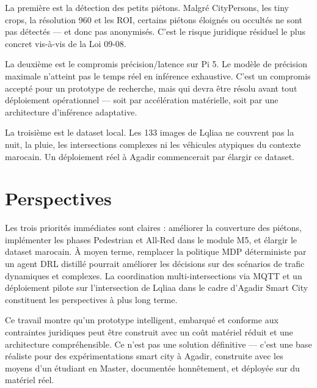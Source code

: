 La première est la détection des petits
piétons. Malgré CityPersons, les tiny
crops, la résolution 960 et les ROI,
certains piétons éloignés ou occultés
ne sont pas détectés — et donc pas
anonymisés. C'est le risque juridique
résiduel le plus concret vis-à-vis de
la Loi 09-08.

La deuxième est le compromis précision/latence
sur Pi 5. Le modèle de précision maximale
n'atteint pas le temps réel en inférence
exhaustive. C'est un compromis accepté
pour un prototype de recherche, mais qui
devra être résolu avant tout déploiement
opérationnel — soit par accélération
matérielle, soit par une architecture
d'inférence adaptative.

La troisième est le dataset local. Les
133 images de Lqliaa ne couvrent pas la
nuit, la pluie, les intersections complexes
ni les véhicules atypiques du contexte
marocain. Un déploiement réel à Agadir
commencerait par élargir ce dataset.

\section*{Perspectives}
{}

Les trois priorités immédiates sont claires :
améliorer la couverture des piétons,
implémenter les phases Pedestrian et All-Red
dans le module M5, et élargir le dataset
marocain. À moyen terme, remplacer la
politique MDP déterministe par un agent
DRL distillé pourrait améliorer les
décisions sur des scénarios de trafic
dynamiques et complexes. La coordination
multi-intersections via MQTT et un
déploiement pilote sur l'intersection
de Lqliaa dans le cadre d'Agadir Smart
City constituent les perspectives à plus
long terme.

Ce travail montre qu'un prototype
intelligent, embarqué et conforme aux
contraintes juridiques peut être construit
avec un coût matériel réduit et une
architecture compréhensible. Ce n'est
pas une solution définitive — c'est une
base réaliste pour des expérimentations
smart city à Agadir, construite avec
les moyens d'un étudiant en Master,
documentée honnêtement, et déployée
sur du matériel réel.